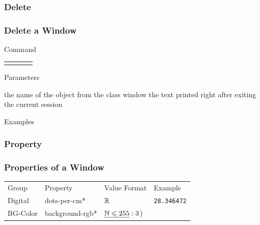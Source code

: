 \documentclass[9pt]{beamer}
\begin{document}
\subsubsection{Delete}

\begin{frame}[t] \frametitle{Delete a Window}

	\begin{block}{Command} 
		\begin{tabularx}{\textwidth}{@{}l@{}l@{}l@{}R}
			 &
				 &
			  	 & \InstrItem
		\end{tabularx}
	\end{block}

	\begin{block}{Parameters} \begin{itemize}
		   the name of the object from the class window
		    the text printed right after exiting the current session
	\end{itemize} \end{block}

	\begin{block}{Examples}
	\end{block}

\end{frame}

\subsubsection{Property}

\begin{frame}[t] \frametitle{Properties of a Window}

	\renewcommand\arraystretch{1.6}
	\begin{tabularx}{\textwidth}{|l|l|l|R|}
		\hline
		Group      & Property        & Value Format & Example \\ \hhline{|=|=|=|=|}
		Digital    & dots-per-cm*    & $\MSR$ & \texttt{28.346472} \\ \hline
		BG-Color   & background-rgb* & $\Tup{\underline{\MSN\leqslant 255}}{3}$ & \texttt{} \\ \hline
	\end{tabularx}

\end{frame}
\end{document}
